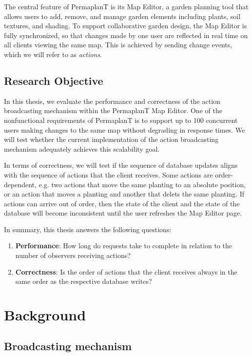 \documentclass[final,draft,oneside]{vutinfth}
\begin{document}
The central feature of PermaplanT is its Map Editor, a garden planning tool that allows users to add, remove, and manage garden elements including plants, soil textures, and shading.
To support collaborative garden design, the Map Editor is fully synchronized, so that changes made by one user are reflected in real time on all clients viewing the same map. This is achieved by sending change events, which we will refer to as \emph{actions}.

\section{Research Objective}

In this thesis, we evaluate the performance and correctness of the action broadcasting mechanism within the PermaplanT Map Editor.
One of the nonfunctional requirements of PermaplanT is to support up to 100 concurrent users making changes to the same map without degrading in response times.
We will test whether the current implementation of the action broadcasting mechanism adequately achieves this scalability goal.

In terms of correctness, we will test if the sequence of database updates aligns with the sequence of actions that the client receives.
Some actions are order-dependent, e.g. two actions that move the same planting to an absolute position, or an action that moves a planting and another that delets the same planting. If actions can arrive out of order, then the state of the client and the state of the database will become inconsistent until the user refreshes the Map Editor page.

In summary, this thesis answers the following questions:
\begin{enumerate}
  \item \textbf{Performance}: How long do requests take to complete in relation to the number of observers receiving actions?
  \item \textbf{Correctness}: Is the order of actions that the client receives always in the same order as the respective database writes? 
\end{enumerate}

\chapter{Background}

\section{Broadcasting mechanism}
\end{document}
